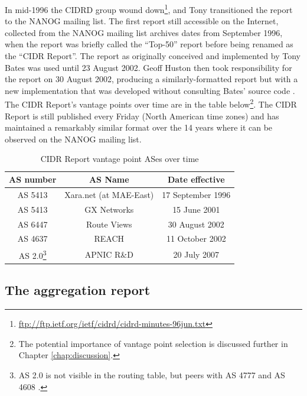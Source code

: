 In mid-1996 the CIDRD group wound down\footnote{
\url{ftp://ftp.ietf.org/ietf/cidrd/cidrd-minutes-96jun.txt}}, and Tony
transitioned the report to the NANOG mailing list. The first report still
accessible on the Internet, collected from the NANOG mailing list archives
\cite{NANOG} dates from September 1996, when the report was briefly called the
``Top-50'' report before being renamed as the ``CIDR Report''. The report as
originally conceived and implemented by Tony Bates was used until 23 August
2002. Geoff Huston then took responsibility for the report on 30 August 2002,
producing a similarly-formatted report but with a new implementation that was
developed without consulting Bates' source code \cite{Huston:2011ys}. The CIDR
Report's vantage points over time are in the table below\footnote{The potential
importance of vantage point selection is discussed further in Chapter
\ref{chap:discussion}.}. The CIDR Report is still published every Friday (North
American time zones) and has maintained a remarkably similar format over the 14
years where it can be observed on the NANOG mailing list.

\savenotes
\begin{table}[h]
    \begin{center}
    \small
    \begin{tabular}{c | c | c}
        AS number & AS Name & Date effective \\
        \hline
        AS 5413 & Xara.net (at MAE-East) & 17 September 1996 \\
        AS 5413 & GX Networks & 15 June 2001 \\
        AS 6447 & Route Views & 30 August 2002 \\
        AS 4637 & REACH & 11 October 2002 \\
        AS 2.0\footnote{AS 2.0 is not visible in the routing table, but peers
        with AS 4777 and AS 4608 \cite{Huston:2011ys}.} & APNIC R\&D & 20 July
        2007 \\
    \end{tabular}
    \vspace{1em}
    \caption{CIDR Report vantage point ASes over time}
    \label{table:cr_vantage_points}
    \end{center}
\end{table}
\spewnotes

\subsection{The aggregation report}

